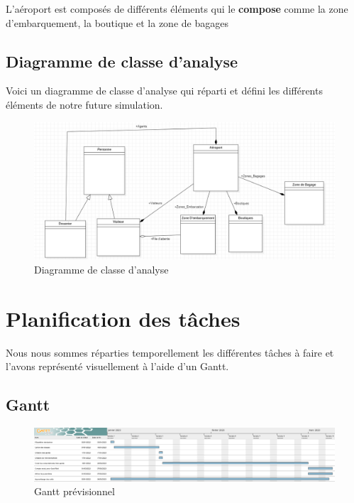 \documentclass[12pt,french]{article} %
\begin{document}
L'aéroport est composés de différents éléments qui le \textbf{compose} comme la zone d'embarquement, la boutique et la zone de bagages


\subsection{Diagramme de classe d'analyse}

Voici un diagramme de classe d'analyse qui réparti et défini les différents éléments de notre future simulation.

\begin{figure}[H]
	\centering
	\includegraphics[scale=0.4]{analyse.png}
	\caption{Diagramme de classe d'analyse}    
\end{figure}

\section{Planification des tâches}

Nous nous sommes réparties temporellement les différentes tâches à faire et l'avons représenté visuellement à l'aide d'un Gantt.

\subsection{Gantt}

\begin{figure}[H]
	\centering
	\includegraphics[scale=0.35]{gantt.png}
	\caption{Gantt prévisionnel}    
\end{figure}

\bigskip
\end{document}
